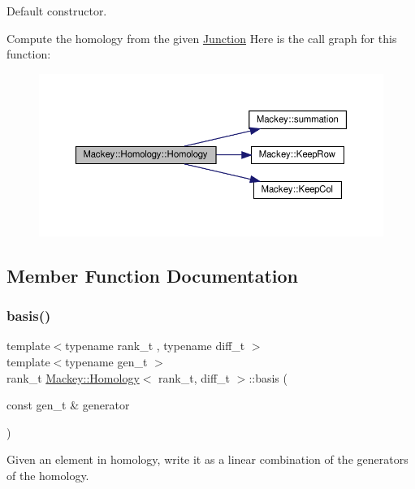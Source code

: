 Default constructor. 

Compute the homology from the given \hyperlink{classMackey_1_1Junction}{Junction} Here is the call graph for this function\+:\nopagebreak
\begin{figure}[H]
\begin{center}
\leavevmode
\includegraphics[width=350pt]{classMackey_1_1Homology_a31e26f0fb8e1cd7f0506ae1dbc97ea22_cgraph}
\end{center}
\end{figure}


\subsection{Member Function Documentation}
\mbox{\label{classMackey_1_1Homology_a3ef6bc9a9859c3711c11d153ba55b3e1}} 
\subsubsection{\texorpdfstring{basis()}{basis()}}
{\footnotesize\ttfamily template$<$typename rank\+\_\+t , typename diff\+\_\+t $>$ \\
template$<$typename gen\+\_\+t $>$ \\
rank\+\_\+t \hyperlink{classMackey_1_1Homology}{Mackey\+::\+Homology}$<$ rank\+\_\+t, diff\+\_\+t $>$\+::basis (\begin{DoxyParamCaption}\item[{const gen\+\_\+t \&}]{generator }\end{DoxyParamCaption})}



Given an element in homology, write it as a linear combination of the generators of the homology. 

